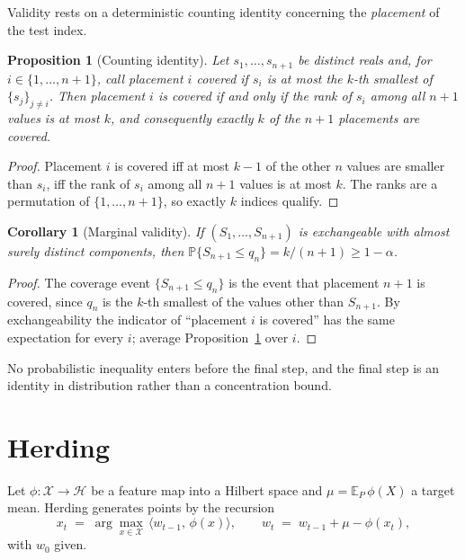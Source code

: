 \documentclass[11pt]{article}
\newtheorem{proposition}{Proposition}
\newtheorem{corollary}{Corollary}
\theoremstyle{remark}
\newcommand{\E}{\mathbb{E}}
\newcommand{\Prob}{\mathbb{P}}
\begin{document}
Validity rests on a deterministic counting identity concerning the \emph{placement} of the test
index.

\begin{proposition}[Counting identity]\label{prop:count}
Let $s_1,\dots,s_{n+1}$ be distinct reals and, for $i\in\{1,\dots,n+1\}$, call placement $i$
\emph{covered} if $s_i$ is at most the $k$-th smallest of $\{s_j\}_{j\ne i}$. Then placement $i$
is covered if and only if the rank of $s_i$ among all $n+1$ values is at most $k$, and
consequently exactly $k$ of the $n+1$ placements are covered.
\end{proposition}

\begin{proof}
Placement $i$ is covered iff at most $k-1$ of the other $n$ values are smaller than $s_i$, iff the
rank of $s_i$ among all $n+1$ values is at most $k$. The ranks are a permutation of
$\{1,\dots,n+1\}$, so exactly $k$ indices qualify.
\end{proof}

\begin{corollary}[Marginal validity]\label{cor:valid}
If $(S_1,\dots,S_{n+1})$ is exchangeable with almost surely distinct components, then
$\Prob\{S_{n+1}\le q_n\}=k/(n+1)\ge 1-\alpha$.
\end{corollary}

\begin{proof}
The coverage event $\{S_{n+1}\le q_n\}$ is the event that placement $n+1$ is covered, since
$q_n$ is the $k$-th smallest of the values other than $S_{n+1}$. By exchangeability the indicator
of ``placement $i$ is covered'' has the same expectation for every $i$; average
Proposition~\ref{prop:count} over $i$.
\end{proof}

No probabilistic inequality enters before the final step, and the final step is an identity in
distribution rather than a concentration bound.

\section{Herding}\label{sec:herding}

Let $\phi:\mathcal X\to\mathcal H$ be a feature map into a Hilbert space and
$\mu=\E_{P}\,\phi(X)$ a target mean. Herding \citep{welling2009} generates points by the recursion
\begin{equation}\label{eq:herding}
x_{t}\;=\;\arg\max_{x\in\mathcal X}\,\langle w_{t-1},\,\phi(x)\rangle,
\qquad
w_{t}\;=\;w_{t-1}+\mu-\phi(x_{t}),
\end{equation}
with $w_0$ given.
\end{document}

